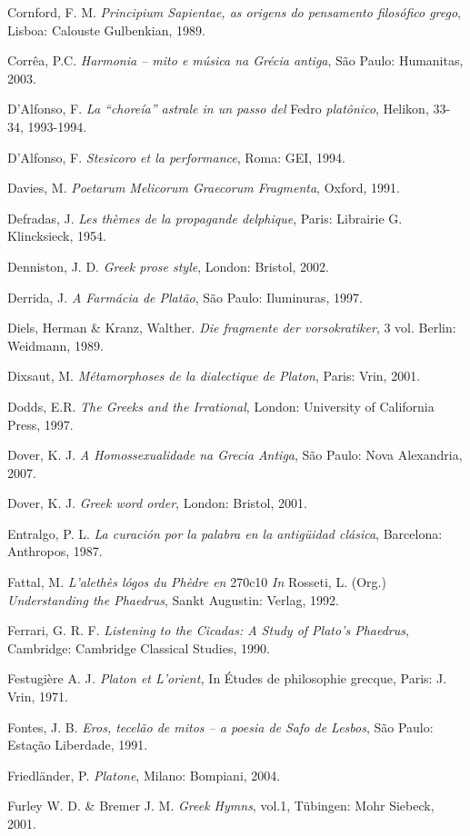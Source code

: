 Cornford, F. M. \emph{Principium Sapientae, as origens do pensamento
filosófico grego}, Lisboa: Calouste Gulbenkian, 1989.

Corrêa, P.C. \emph{Harmonia -- mito e música na Grécia antiga}, São
Paulo: Humanitas, 2003.

D'Alfonso, F. \emph{La ``choreía'' astrale in un passo del} Fedro
\emph{platônico}, Helikon, 33-34, 1993-1994.

D'Alfonso, F. \emph{Stesicoro et la performance}, Roma: GEI, 1994.

Davies, M. \emph{Poetarum Melicorum Graecorum Fragmenta}, Oxford, 1991.

Defradas, J. \emph{Les thèmes de la propagande delphique}, Paris:
Librairie G. Klincksieck, 1954.

Denniston, J. D. \emph{Greek prose style}, London: Bristol, 2002.

Derrida, J. \emph{A Farmácia de Platão}, São Paulo: Iluminuras, 1997.

Diels, Herman \& Kranz, Walther. \emph{Die fragmente der vorsokratiker},
3 vol. Berlin: Weidmann, 1989.

Dixsaut, M. \emph{Métamorphoses de la dialectique de Platon}, Paris:
Vrin, 2001.

Dodds, E.R. \emph{The Greeks and the Irrational}, London: University of
California Press, 1997.

Dover, K. J. \emph{A Homossexualidade na Grecia Antiga}, São Paulo: Nova
Alexandria, 2007.

Dover, K. J. \emph{Greek word order}, London: Bristol, 2001.

Entralgo, P. L. \emph{La curación por la palabra en la antigüidad
clásica}, Barcelona: Anthropos, 1987.

Fattal, M. \emph{L'alethès lógos du Phèdre en} 270c10 \emph{In} Rosseti,
L. (Org.) \emph{Understanding the Phaedrus}, Sankt Augustin: Verlag,
1992.

Ferrari, G. R. F. \emph{Listening to the Cicadas: A Study of Plato's
Phaedrus}, Cambridge: Cambridge Classical Studies, 1990.

Festugière A. J\emph{. Platon et L'orient,} In Études de philosophie
grecque, Paris: J. Vrin, 1971.

Fontes, J. B. \emph{Eros, tecelão de mitos -- a poesia de Safo de
Lesbos}, São Paulo: Estação Liberdade, 1991.

Friedländer, P. \emph{Platone}, Milano: Bompiani, 2004.

Furley W. D. \& Bremer J. M. \emph{Greek Hymns}, vol.1, Tübingen: Mohr
Siebeck, 2001.

